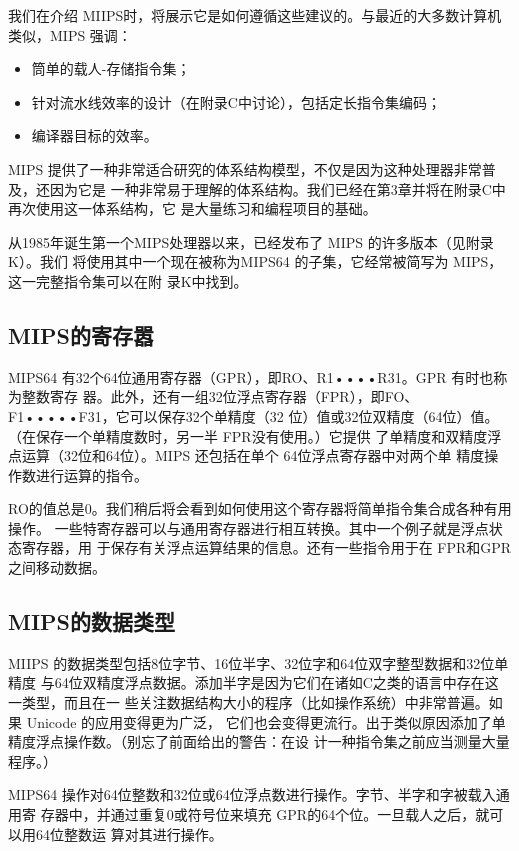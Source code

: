 我们在介绍 MIIPS时，将展示它是如何遵循这些建议的。与最近的大多数计算机类似，MIPS
强调：

\begin{itemize}
    \item 筒单的载人-存储指令集；
    \item 针对流水线效率的设计（在附录C中讨论），包括定长指令集编码；
    \item 编译器目标的效率。
\end{itemize}

MIPS 提供了一种非常适合研究的体系结构模型，不仅是因为这种处理器非常普及，还因为它是
一种非常易于理解的体系结构。我们已经在第3章并将在附录C中再次使用这一体系结构，它
是大量练习和编程项目的基础。

从1985年诞生第一个MIPS处理器以来，已经发布了 MIPS 的许多版本（见附录K）。我们
将使用其中一个现在被称为MIPS64 的子集，它经常被简写为 MIPS，这一完整指令集可以在附
录K中找到。

\subsection{MIPS的寄存嚣}
MIPS64 有32个64位通用寄存器（GPR），即RO、R1••••R31。GPR 有时也称为整数寄存
器。此外，还有一组32位浮点寄存器（FPR），即FO、F1•••••F31，它可以保存32个单精度（32
位）值或32位双精度（64位）值。（在保存一个单精度数时，另一半 FPR没有使用。）它提供
了单精度和双精度浮点运算（32位和64位）。MIPS 还包括在单个 64位浮点寄存器中对两个单
精度操作数进行运算的指令。

RO的值总是0。我们稍后将会看到如何使用这个寄存器将简单指令集合成各种有用操作。
一些特寄存器可以与通用寄存器进行相互转换。其中一个例子就是浮点状态寄存器，用
于保存有关浮点运算结果的信息。还有一些指令用于在 FPR和GPR之间移动数据。

\subsection{MIPS的数据类型}

MIIPS 的数据类型包括8位字节、16位半字、32位字和64位双字整型数据和32位单精度
与64位双精度浮点数据。添加半字是因为它们在诸如C之类的语言中存在这一类型，而且在一
些关注数据结构大小的程序（比如操作系统）中非常普遍。如果 Unicode 的应用变得更为广泛，
它们也会变得更流行。出于类似原因添加了单精度浮点操作数。（别忘了前面给出的警告：在设
计一种指令集之前应当测量大量程序。）

MIPS64 操作对64位整数和32位或64位浮点数进行操作。字节、半字和字被载入通用寄
存器中，并通过重复0或符号位来填充 GPR的64个位。一旦载人之后，就可以用64位整数运
算对其进行操作。

